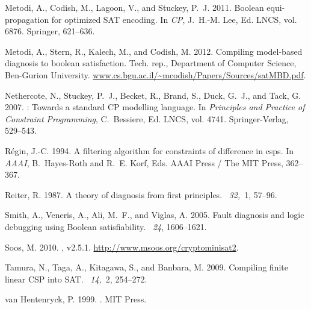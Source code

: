\documentclass{tlp}
\begin{document}
\begin{thebibliography}{}
{\sc Metodi, A.}, {\sc Codish, M.}, {\sc Lagoon, V.}, {\sc and} {\sc Stuckey,
  P.~J.} 2011.
\newblock Boolean equi-propagation for optimized {SAT} encoding.
\newblock In {\em CP}, {J.~H.-M. Lee}, Ed. LNCS, vol. 6876. Springer, 621--636.

{\sc Metodi, A.}, {\sc Stern, R.}, {\sc Kalech, M.}, {\sc and} {\sc Codish, M.}
  2012.
\newblock Compiling model-based diagnosis to boolean satisfaction.
\newblock Tech. rep., Department of Computer Science, Ben-Gurion University.
\newblock \url{www.cs.bgu.ac.il/~mcodish/Papers/Sources/satMBD.pdf}.

{\sc Nethercote, N.}, {\sc Stuckey, P.~J.}, {\sc Becket, R.}, {\sc Brand, S.},
  {\sc Duck, G.~J.}, {\sc and} {\sc Tack, G.} 2007.
: Towards a standard {CP} modelling language.
\newblock In {\em Principles and Practice of Constraint Programming},
  {C.~Bessiere}, Ed. LNCS, vol. 4741. Springer-Verlag, 529--543.

{\sc R{\'e}gin, J.-C.} 1994.
\newblock A filtering algorithm for constraints of difference in csps.
\newblock In {\em AAAI}, {B.~Hayes-Roth} {and} {R.~E. Korf}, Eds. AAAI Press /
  The MIT Press, 362--367.

{\sc Reiter, R.} 1987.
\newblock A theory of diagnosis from first principles.
~{\em 32,\/}~1, 57--96.

{\sc Smith, A.}, {\sc Veneris, A.}, {\sc Ali, M.~F.}, {\sc and} {\sc Viglas,
  A.} 2005.
\newblock Fault diagnosis and logic debugging using {B}oolean satisfiability.
~{\em 24}, 1606--1621.

{\sc Soos, M.} 2010.
, v2.5.1.
\newblock \url{http://www.msoos.org/cryptominisat2}.

{\sc Tamura, N.}, {\sc Taga, A.}, {\sc Kitagawa, S.}, {\sc and} {\sc Banbara,
  M.} 2009.
\newblock Compiling finite linear {CSP} into {SAT}.
~{\em 14,\/}~2, 254--272.

{\sc van Hentenryck, P.} 1999.
.
\newblock MIT Press.

\end{thebibliography}
\end{document}
